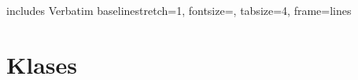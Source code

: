 \DefineVerbatimEnvironment
	{includes}
	{Verbatim}
	{
		baselinestretch=1,
		fontsize=,
		tabsize=4,
		frame=lines
	}

\newenvironment{memblist}
	{\begin{tabbing}\hspace{3cm}\=\kill}
	{\end{tabbing}}

\newcommand{\memb}[3]{\>#1\'\inbold{#2} (#3)\\}
\newcommand{\membX}[4]{\>#1\'\inbold{#2} (#3) [#4]\\}

\newcommand{\publictypes}{\subsubsection*{Publiskie tipi}}
\newcommand{\publicmethods}{\subsubsection*{Publiskās metodes}}
\newcommand{\protectedmethods}{\subsubsection*{Aizsargātās metodes}}
\newcommand{\staticmethods}{\subsubsection*{Publiskās statiskās metodes}}
\newcommand{\signals}{\subsubsection*{Signāli}}

\newcommand{\classdescription}{\subsubsection*{Detalizēts klases apraksts}}
\newcommand{\methoddescription}{\subsubsection*{Metožu apraksts}}
\newcommand{\method}[1]{$\Longrightarrow$ #1\\}

\newcommand{\inputclass}[1]{}

\section{Klases}
\inputclass{mt_exception}
\inputclass{mt_abstract_document}

